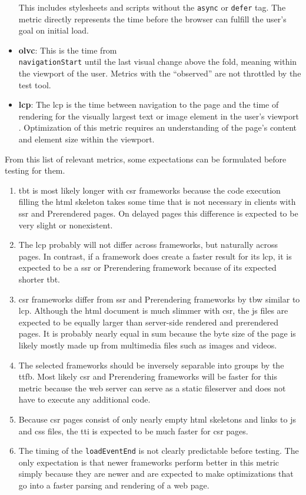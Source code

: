 \documentclass[a4paper, 12pt]{article}
\begin{document}
\begin{itemize}
  This includes stylesheets and scripts without the \verb|async| or \verb|defer| tag.
  The metric directly represents the time before the browser can fulfill the user's goal on initial load.
  \item \textbf{\acrfull{olvc}}: This is the time from \\
  \verb|navigationStart| until the last visual change above the fold, meaning within the viewport of the user.
  Metrics with the \enquote{observed} are not throttled by the test tool.
  \item \textbf{\acrfull{lcp}}: The \acrshort{lcp} is the time between navigation to the page and the time of rendering for the visually largest text or image element in the user's viewport \citep{lcpDocumentation}.
  Optimization of this metric requires an understanding of the page's content and element size within the viewport.
\end{itemize}

From this list of relevant metrics, some expectations can be formulated before testing for them.
\begin{enumerate}
  \item \acrshort{tbt} is most likely longer with \acrshort{csr} frameworks because the code execution filling the \acrshort{html} skeleton takes some time that is not necessary in clients with \acrshort{ssr} and Prerendered pages.
  On delayed pages this difference is expected to be very slight or nonexistent.
  \item The \acrshort{lcp} probably will not differ across frameworks, but naturally across pages.
  In contrast, if a framework does create a faster result for its \acrshort{lcp}, it is expected to be a \acrshort{ssr} or Prerendering framework because of its expected shorter \acrshort{tbt}.
  \item \acrshort{csr} frameworks differ from \acrshort{ssr} and Prerendering frameworks by \acrlong{tbw} similar to \acrlong{lcp}.
  Although the \acrshort{html} document is much slimmer with \acrshort{csr}, the \acrshort{js} files are expected to be equally larger than server-side rendered and prerendered pages.
  It is probably nearly equal in sum because the byte size of the page is likely mostly made up from multimedia files such as images and videos. 
  \item The selected frameworks should be inversely separable into groups by the \acrlong{ttfb}.
  Most likely \acrshort{csr} and Prerendering frameworks will be faster for this metric because the web server can serve as a static fileserver and does not have to execute any additional code.
  \item Because \acrshort{csr} pages consist of only nearly empty \acrshort{html} skeletons and links to \acrshort{js} and \acrshort{css} files, the \acrshort{tti} is expected to be much faster for \acrshort{csr} pages.
  \item The timing of the \verb|loadEventEnd| is not clearly predictable before testing.
  The only expectation is that newer frameworks perform better in this metric simply because they are newer and are expected to make optimizations that go into a faster parsing and rendering of a web page.
\end{enumerate}
  
\end{document}
